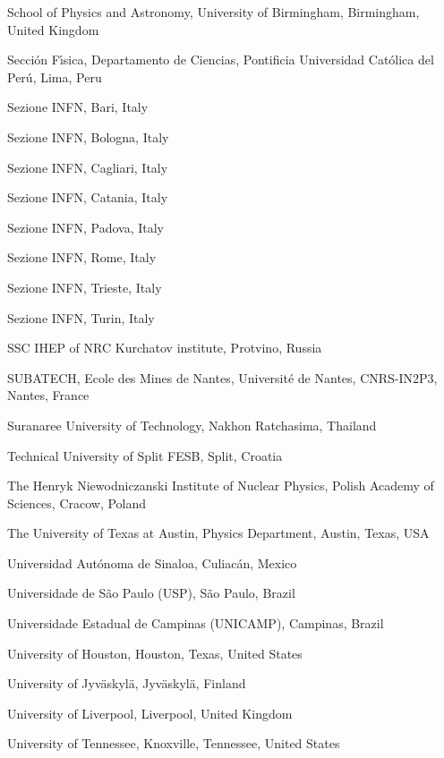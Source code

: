 \begin{flushleft}
\begin{Authlist}
\item {}School of Physics and Astronomy, University of Birmingham, Birmingham, United Kingdom
\item {}Secci\'{o}n F\'{\i}sica, Departamento de Ciencias, Pontificia Universidad Cat\'{o}lica del Per\'{u}, Lima, Peru
\item {}Sezione INFN, Bari, Italy
\item {}Sezione INFN, Bologna, Italy
\item {}Sezione INFN, Cagliari, Italy
\item {}Sezione INFN, Catania, Italy
\item {}Sezione INFN, Padova, Italy
\item {}Sezione INFN, Rome, Italy
\item {}Sezione INFN, Trieste, Italy
\item {}Sezione INFN, Turin, Italy
\item {}SSC IHEP of NRC Kurchatov institute, Protvino, Russia
\item {}SUBATECH, Ecole des Mines de Nantes, Universit\'{e} de Nantes, CNRS-IN2P3, Nantes, France
\item {}Suranaree University of Technology, Nakhon Ratchasima, Thailand
\item {}Technical University of Split FESB, Split, Croatia
\item {}The Henryk Niewodniczanski Institute of Nuclear Physics, Polish Academy of Sciences, Cracow, Poland
\item {}The University of Texas at Austin, Physics Department, Austin, Texas, USA
\item {}Universidad Aut\'{o}noma de Sinaloa, Culiac\'{a}n, Mexico
\item {}Universidade de S\~{a}o Paulo (USP), S\~{a}o Paulo, Brazil
\item {}Universidade Estadual de Campinas (UNICAMP), Campinas, Brazil
\item {}University of Houston, Houston, Texas, United States
\item {}University of Jyv\"{a}skyl\"{a}, Jyv\"{a}skyl\"{a}, Finland
\item {}University of Liverpool, Liverpool, United Kingdom
\item {}University of Tennessee, Knoxville, Tennessee, United States

\end{Authlist}
\end{flushleft}
